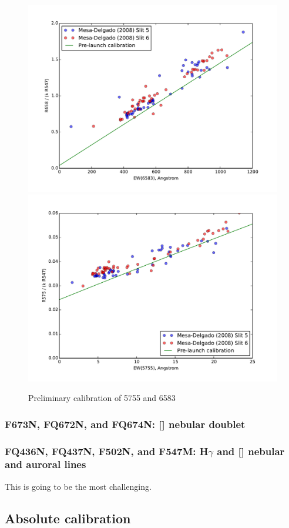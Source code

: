 \documentclass[preprint, 12pt]{aastex}
\newcommand\oiii{[\ion{O}{3}]}
\newcommand\sii{[\ion{S}{2}]}
\begin{document}
\begin{figure}
  \centering
  \includegraphics[width=0.8\linewidth]{adal-w6583-calibration}
  \includegraphics[width=0.8\linewidth]{adal-w5755-calibration}
  \caption{Preliminary calibration of 5755 and 6583}
  \label{fig:adal}
\end{figure}

\subsubsection{F673N, FQ672N, and FQ674N: \sii{} nebular doublet}
\label{sec:673-672-674}

\subsubsection{FQ436N, FQ437N, F502N, and F547M: H\(\gamma\) and
  \oiii{} nebular and auroral lines}
\label{sec:437}
This is going to be the most challenging. 


\subsection{Absolute calibration}
\label{sec:absolute}
\end{document}
